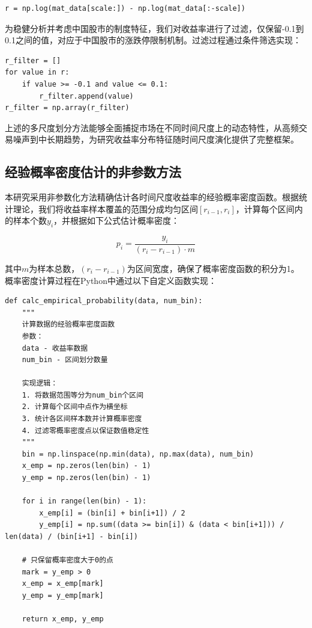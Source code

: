\documentclass[12pt, a4paper]{article}
\begin{document}
\begin{verbatim}
r = np.log(mat_data[scale:]) - np.log(mat_data[:-scale])
\end{verbatim}

为稳健分析并考虑中国股市的制度特征，我们对收益率进行了过滤，仅保留-0.1到0.1之间的值，对应于中国股市的涨跌停限制机制。过滤过程通过条件筛选实现：

\begin{verbatim}
r_filter = []
for value in r:
    if value >= -0.1 and value <= 0.1:
        r_filter.append(value)
r_filter = np.array(r_filter)
\end{verbatim}

上述的多尺度划分方法能够全面捕捉市场在不同时间尺度上的动态特性，从高频交易噪声到中长期趋势，为研究收益率分布特征随时间尺度演化提供了完整框架。

\subsection{经验概率密度估计的非参数方法}

本研究采用非参数化方法精确估计各时间尺度收益率的经验概率密度函数。根据统计理论，我们将收益率样本覆盖的范围分成均匀区间$[r_{i-1}, r_i]$，计算每个区间内的样本个数$y_i$，并根据如下公式估计概率密度：

\begin{equation}
p_i = \frac{y_i}{(r_i-r_{i-1}) \cdot m}
\end{equation}

其中$m$为样本总数，$(r_i-r_{i-1})$为区间宽度，确保了概率密度函数的积分为1。概率密度计算过程在Python中通过以下自定义函数实现：

\begin{verbatim}
def calc_empirical_probability(data, num_bin):
    """
    计算数据的经验概率密度函数
    参数：
    data - 收益率数据
    num_bin - 区间划分数量
    
    实现逻辑：
    1. 将数据范围等分为num_bin个区间
    2. 计算每个区间中点作为横坐标
    3. 统计各区间样本数并计算概率密度
    4. 过滤零概率密度点以保证数值稳定性
    """
    bin = np.linspace(np.min(data), np.max(data), num_bin)
    x_emp = np.zeros(len(bin) - 1)
    y_emp = np.zeros(len(bin) - 1)
    
    for i in range(len(bin) - 1):
        x_emp[i] = (bin[i] + bin[i+1]) / 2
        y_emp[i] = np.sum((data >= bin[i]) & (data < bin[i+1])) / len(data) / (bin[i+1] - bin[i])
    
    # 只保留概率密度大于0的点
    mark = y_emp > 0
    x_emp = x_emp[mark]
    y_emp = y_emp[mark]
    
    return x_emp, y_emp
\end{verbatim}
\end{document}

